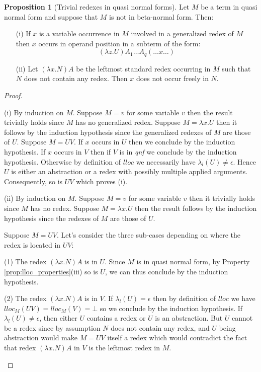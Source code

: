 \documentclass{article}
\theoremstyle{definition}
\newtheorem{proposition}{Proposition}[section]
\begin{document}
\begin{proposition}[Trivial redexes in quasi normal forms]
\label{prop:qnf_nf}
Let $M$ be a term in quasi normal form and suppose that $M$ is not in beta-normal form. Then:
\begin{itemize}
\item[(i)] If $x$ is a variable occurrence in $M$ involved in a generalized redex of $M$ then $x$ occurs in operand position in a subterm of the form:
$$(\lambda z .U) A_1 \ldots A_q (\ldots x \ldots) $$
\item[(ii)] Let $(\lambda x . N) A$ be the leftmost standard redex occurring in $M$ such that $N$ does not contain any redex. Then $x$ does not occur freely in $N$.
\end{itemize}
\end{proposition}
\begin{proof}
\begin{compactitem}
\item[(i)] By induction on $M$. Suppose $M = v$ for some variable $v$ then the result trivially holds since $M$ has no generalized redex. Suppose $M = \lambda x . U$ then it follows by the induction hypothesis since the generalized redexes of $M$ are those of $U$.
Suppose $M = U V$. If $x$ occurs in $U$ then we conclude by the induction hypothesis. If $x$ occurs in $V$ then if $V$ is in \emph{qnf} we conclude by the induction hypothesis. Otherwise by definition of $lloc$ we necessarily have $\lambda_l(U) \neq \epsilon$. Hence $U$ is either an abstraction or a redex with possibly multiple applied arguments. Consequently, so is $UV$ which proves (i).

\item[(ii)] By induction on $M$. Suppose $M = v$ for some variable $v$ then it trivially holds since $M$ has no redex. Suppose $M = \lambda x . U$ then the result follows by the induction hypothesis since the redexes of $M$ are those of $U$.

Suppose $M = U V$. Let's consider the three sub-cases depending on where the redex is located in $U V$:
\begin{compactitem}
  \item[(1)] The redex $(\lambda x . N) A$  is in $U$. Since $M$ is in quasi normal form, by Property \ref{prop:lloc_properties}(iii) so is $U$, we can thus conclude by the induction hypothesis.

  \item[(2)] The redex $(\lambda x . N) A$  is in $V$.
If $\lambda_l(U) = \epsilon$ then by definition of $lloc$ we have $lloc_M(UV) = lloc_M(V) = \bot$ so we conclude by the induction hypothesis.
If $\lambda_l(U) \neq \epsilon$, then either $U$ contains a redex or $U$ is an abstraction. But $U$ cannot be a redex since by assumption $N$ does not contain any redex, and $U$ being abstraction would make $M = U V$ itself a redex which would contradict the fact that redex $(\lambda x . N) A$ in $V$ is the leftmost redex in $M$.


\end{compactitem}
\end{compactitem}
\end{proof}
\end{document}
